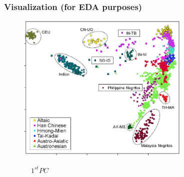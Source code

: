 \documentclass[xcolor={dvipsnames}]{beamer}
\begin{document}
\frame
{
 \frametitle{Visualization (for EDA purposes)}

 \begin{figure}
 \centering
{}\;\;\includegraphics[width=3.25in]{stuff/dna_pca.jpg}

$\quad 1^{st} PC$
\end{figure}

}
\end{document}
